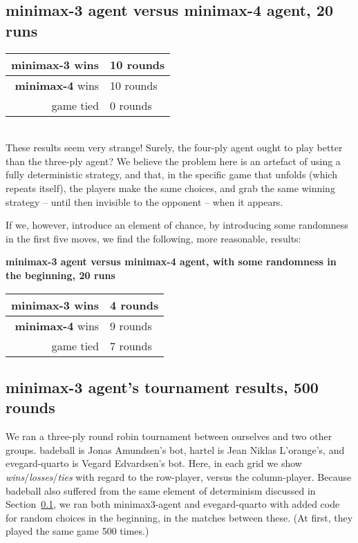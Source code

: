 \documentclass[a4paper,9pt]{article}
\begin{document}
\vspace{10pt}
\subsection{minimax-3 agent versus minimax-4 agent, 20 runs}
\label{sec:3vs4}
{ \Large
\begin{tabular}{r|l}
  \textbf{minimax-3} \textsf{wins} & 10 \textsf{rounds} \\
  \hline
  \textbf{minimax-4} \textsf{wins} & 10 \textsf{rounds} \\
  \hline
  \textsf{game tied}            & 0 \textsf{rounds} \\
\end{tabular}
}
\\

\noindent
These results seem very strange! Surely, the four-ply agent ought to play
better than the three-ply agent? We believe the problem here is an artefact of
using a fully deterministic strategy, and that, in the specific game that
unfolds (which repeats itself), the players make the same choices, and grab the
same winning strategy -- until then invisible to the opponent -- when it
appears.

If we, however, introduce an element of chance, by introducing some randomness
in the first five moves, we find the following, more reasonable, results:
\\

{ 
\noindent
{\small \textbf{minimax-3 agent versus minimax-4 agent, with some
randomness in the beginning, 20 runs} }
\\

\begin{tabular}{r|l}
  \textbf{minimax-3} \textsf{wins} & 4 \textsf{rounds} \\
  \hline
  \textbf{minimax-4} \textsf{wins} & 9 \textsf{rounds} \\
  \hline
  \textsf{game tied}            & 7 \textsf{rounds} \\
\end{tabular}
}

\clearpage


\vspace{10pt}
\subsection{minimax-3 agent's tournament results, 500 rounds}
We ran a three-ply round robin tournament between ourselves and two other
groups.  \textsf{badeball} is Jonas Amundsen's bot, \textsf{hartel} is Jean
Niklas L'orange's, and \textsf{evegard-quarto} is Vegard Edvardsen's bot.
Here, in each grid we show \emph{wins}/\emph{losses}/\emph{ties} with regard to
the row-player, versus the column-player. Because \textsf{badeball} also
suffered from the same element of determinism discussed in
Section~\ref{sec:3vs4}, we ran both \textsf{minimax3-agent} and
\textsf{evegard-quarto} with added code for random choices in the beginning, in
the matches between these. (At first, they played the same game 500 times.)
\\
\end{document}
